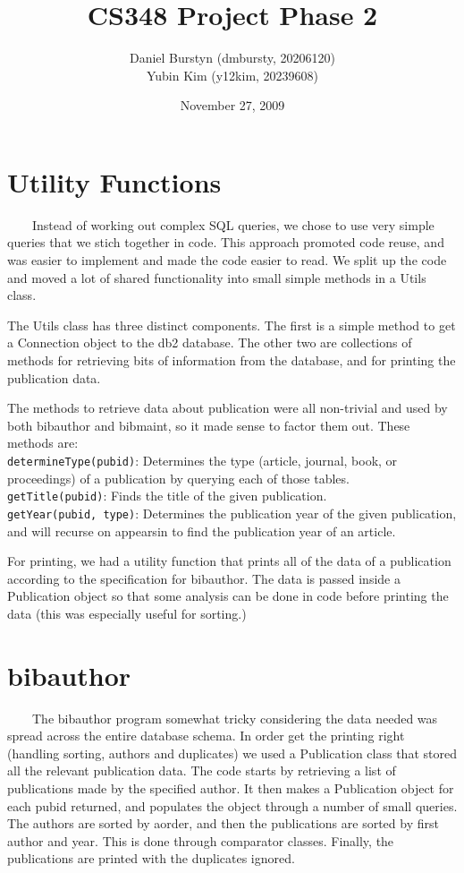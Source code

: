 \documentclass[12pt]{article}
\title{CS348 Project Phase 2}
\author{Daniel Burstyn (dmbursty, 20206120) \\ Yubin Kim (y12kim, 20239608)}
\date{November 27, 2009}
\begin{document}
\maketitle
\newpage

\section{Utility Functions}
\ \ \ \ Instead of working out complex SQL queries, we chose to use very simple
queries that we stich together in code.  This approach promoted code reuse,  and
was easier to implement and made the code easier to read.  We split up the code
and moved a lot of shared functionality into small simple methods in a Utils
class.

The Utils class has three distinct components.  The first is a simple method to
get a Connection object to the db2 database.  The other two are collections of
methods for retrieving bits of information from the database, and for printing
the publication data.

The methods to retrieve data about publication were all non-trivial and used by
both bibauthor and bibmaint, so it made sense to factor them out. These methods
are:\\
\verb!determineType(pubid)!: Determines the type (article, journal, book, or
proceedings) of a publication by querying each of those tables.\\
\verb!getTitle(pubid)!: Finds the title of the given publication.\\
\verb!getYear(pubid, type)!: Determines the publication year of the given
publication, and will recurse on appearsin to find the publication year of an
article.

For printing, we had a utility function that prints all of the data of a
publication according to the specification for bibauthor.  The data is passed
inside a Publication object so that some analysis can be done in code before
printing the data (this was especially useful for sorting.)

\section{bibauthor}
\ \ \ \ The bibauthor program somewhat tricky considering the data needed was
spread across the entire database schema.  In order get the printing right
(handling sorting, authors and duplicates) we used a Publication class that
stored all the relevant publication data.  The code starts by retrieving a list
of publications made by the specified author.  It then makes a Publication
object for each pubid returned, and populates the object through a number of
small queries.  The authors are sorted by aorder, and then the publications are
sorted by first author and year.  This is done through comparator classes.
Finally, the publications are printed with the duplicates ignored.
\end{document}
